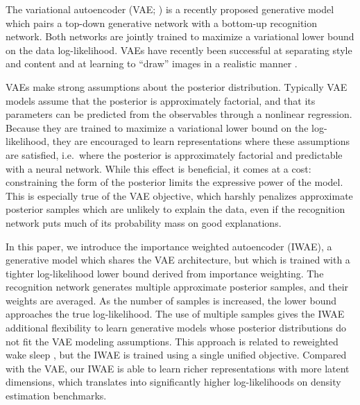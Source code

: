 \documentclass{article} %
\begin{document}
The variational autoencoder (VAE; \citet{vae,vae2}) is a recently proposed generative model which pairs a top-down generative network with a bottom-up recognition network. 
Both networks are jointly trained to maximize a variational lower bound on the data log-likelihood. 
VAEs have recently been successful at separating style and content \citep{vae-semi-supervised,tejas_vae} and at learning to ``draw'' images in a realistic manner \citep{draw}.

VAEs make strong assumptions about the posterior distribution. Typically VAE models assume that the posterior is approximately factorial, and that its parameters can be predicted from the observables through a nonlinear regression. Because they are trained to maximize a variational lower bound on the log-likelihood, they are encouraged to learn representations where these assumptions are satisfied, i.e.~where the posterior is approximately factorial and predictable with a neural network. While this effect is beneficial, it comes at a cost: constraining the form of the posterior limits the expressive power of the model. This is especially true of the VAE objective, which harshly penalizes approximate posterior samples which are unlikely to explain the data, even if the recognition network puts much of its probability mass on good explanations.

In this paper, we introduce the importance weighted autoencoder (IWAE), a generative model which shares the VAE architecture, but which is trained with a tighter log-likelihood lower bound derived from importance weighting. The recognition network generates multiple approximate posterior samples, and their weights are averaged. As the number of samples is increased, the lower bound approaches the true log-likelihood. The use of multiple samples gives the IWAE additional flexibility to learn generative models whose posterior distributions do not fit the VAE modeling assumptions. This approach is related to reweighted wake sleep \citep{RWS}, but the IWAE is trained using a single unified objective. 
Compared with the VAE, our IWAE is able to learn richer representations with more latent dimensions, which translates into significantly higher log-likelihoods on density estimation benchmarks. 
\end{document}
